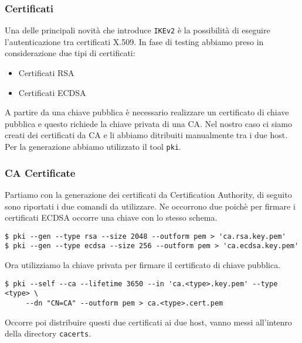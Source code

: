 \documentclass[
10pt, %
a4paper, %
oneside, %
headinclude,footinclude, %
BCOR5mm, %
]{scrartcl}
\begin{document}

\subsubsection*{Certificati}

Una delle principali novità che introduce \lstinline|IKEv2| è la possibilità di eseguire l'autenticazione tra certificati X.509. In fase di testing abbiamo preso in considerazione due tipi di certificati:

\begin{itemize}
    \item Certificati RSA
    \item Certificati ECDSA
\end{itemize}

\noindent
A partire da una chiave pubblica è necessario realizzare un certificato di chiave pubblica e questo richiede la chiave privata di una CA. 
Nel nostro caso ci siamo creati dei certificati da CA e li abbiamo ditribuiti manualmente tra i due host.
Per la generazione abbiamo utilizzato il tool \lstinline|pki|.

\subsubsection*{CA Certificate}
Partiamo con la generazione dei certificati da Certification Authority, di seguito sono riportati i due comandi da utilizzare. Ne occorrono due poichè per firmare
i certificati ECDSA occorre una chiave con lo stesso schema.
\vspace*{0.2cm}
\begin{lstlisting}
$ pki --gen --type rsa --size 2048 --outform pem > 'ca.rsa.key.pem'
$ pki --gen --type ecdsa --size 256 --outform pem > 'ca.ecdsa.key.pem'
\end{lstlisting} 

\vspace*{0.2cm}
\noindent
Ora utilizziamo la chiave privata per firmare il certificato di chiave pubblica.
\begin{lstlisting}
$ pki --self --ca --lifetime 3650 --in 'ca.<type>.key.pem' --type <type> \
     --dn "CN=CA" --outform pem > ca.<type>.cert.pem
\end{lstlisting}

\noindent
Occorre poi distribuire questi due certificati ai due host, vanno messi all'intenro della directory \lstinline|cacerts|.
\end{document}
